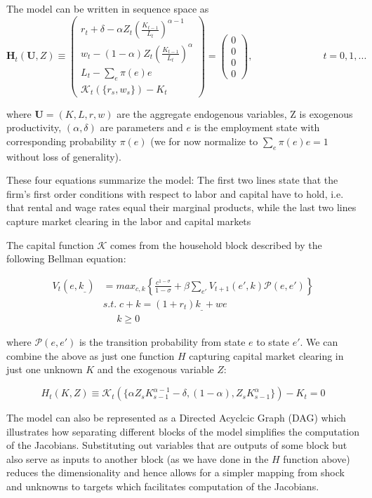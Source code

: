 \documentclass[10pt]{article} %
\begin{document}
The model can be written in sequence space as
$$
\mathbf{H}_t(\mathbf{U}, Z) \equiv 
\left( \begin{matrix}
r_t + \delta -\alpha Z_t \left( \frac{K_{t-1}}{L_t} \right)^{\alpha-1} \\
w_t - (1-\alpha)Z_t \left( \frac{K_{t-1}}{L_t} \right)^\alpha \\
L_t - \sum_e \pi(e)e \\
\mathcal{K}_t(\{r_s, w_s\}) - K_t
\end{matrix} \right) = 
\left( \begin{matrix}
0 \\ 0 \\ 0 \\ 0
\end{matrix} \right), \hspace{3cm} t = 0, 1, ...
$$

where $\mathbf{U} = (K, L, r, w)$ are the aggregate endogenous variables, Z is exogenous productivity, $(\alpha, \delta)$ are parameters and $e$ is the employment state with corresponding probability $\pi(e)$ (we for now normalize to $\sum_e \pi(e)e = 1$ without loss of generality).

These four equations summarize the model: The first two lines state that the firm's first order conditions with respect to labor and capital have to hold, i.e. that rental and wage rates equal their marginal products, while the last two lines capture market clearing in the labor and capital markets

The capital function $\mathcal{K}$ comes from the household block described by the following Bellman equation:

\begin{align}
    V_t(e, k_{\_} ) &= max_{c,k} \left\{  \frac{c^{1-\sigma}}{1-\sigma} + \beta \sum_{e'} V_{t+1} (e', k)\mathcal{P}(e, e')  \right\} \\
    &s.t.\; c + k = (1+r_t)k_{\_}+we \\
    &\; \; \; \; \;    k \geq 0
\end{align}

where $\mathcal{P}(e,e')$ is the transition probability from state $e$ to state $e'$.
We can combine the above as just one function $H$ capturing capital market clearing in just one unknown $K$ and the exogenous variable $Z$:

$$ H_t(K, Z) \equiv \mathcal{K}_t(\{\alpha Z_s K^{\alpha-1}_{s-1} - \delta, (1-\alpha), Z_s K_{s-1}^\alpha \} ) - K_t = 0 $$

The model can also be represented as a Directed Acyclcic Graph (DAG) which illustrates how separating different blocks of the model simplifies the computation of the Jacobians. Substituting out variables that are outputs of some block but also serve as inputs to another block (as we have done in the $H$ function above) reduces the dimensionality and hence allows for a simpler mapping from shock and unknowns to targets which facilitates computation of the Jacobians.
\end{document}
